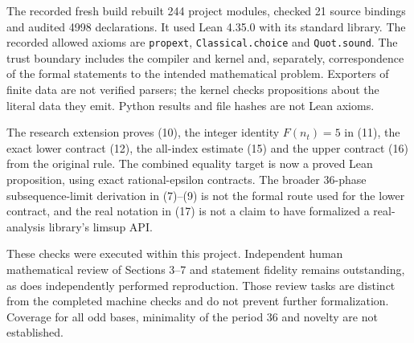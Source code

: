 \documentclass[11pt,a4paper]{article}
\begin{document}
The recorded fresh build rebuilt 244 project modules, checked 21 source
bindings and audited 4998 declarations. It used Lean 4.35.0 with its standard
library. The recorded allowed axioms are \texttt{propext},
\texttt{Classical.choice} and \texttt{Quot.sound}. The trust boundary includes
the compiler and kernel and, separately, correspondence of the formal
statements to the intended mathematical problem. Exporters of finite data
are not verified parsers; the kernel checks propositions about the literal
data they emit. Python results and file hashes are not Lean axioms.

The research extension proves (10), the integer identity $F(n_t)=5$ in
(11), the exact lower contract (12), the all-index estimate (15) and the
upper contract (16) from the original rule. The combined equality target
is now a proved Lean proposition, using exact rational-epsilon contracts.
The broader 36-phase subsequence-limit derivation in (7)--(9) is not the
formal route used for the lower contract, and the real notation in (17)
is not a claim to have formalized a real-analysis library's limsup API.

These checks were executed within this project. Independent human
mathematical review of Sections 3--7 and statement fidelity remains
outstanding, as does independently performed reproduction. Those review
tasks are distinct from the completed machine checks and do not prevent
further formalization. Coverage for all odd bases, minimality of the
period 36 and novelty are not established.
\end{document}
